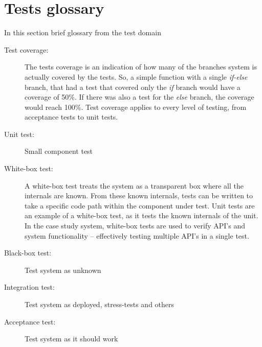 \section{Tests glossary}
In this section brief glossary from the test domain
\begin{description}
  \item[Test coverage:] The tests coverage is an indication of how many of the branches system is actually covered by the tests. So, a simple function with a single \emph{if-else} branch, that had a test that covered only the \emph{if} branch would have a coverage of 50\%. If there was also a test for the \emph{else} branch, the coverage would reach 100\%. Test coverage applies to every level of testing, from acceptance tests to unit tests.
  \item[Unit test:] Small component test
  \item[White-box test:] A white-box test treats the system as a transparent box where all the internals are known. From these known internals, tests can be written to take a specific code path within the component under test. Unit tests are an example of a white-box test, as it tests the known internals of the unit. In the case study system, white-box tests are used to verify API's and system functionality -- effectively testing multiple API's in a single test.
  \item[Black-box test:] Test system as unknown
  \item[Integration test:] Test system as deployed, stress-tests and others
  \item[Acceptance test:] Test system as it should work %
\end{description}


